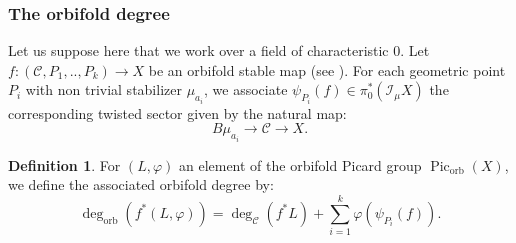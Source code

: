 \documentclass{proc-l}
\DeclareMathOperator{\Pic}{Pic}
\DeclareMathOperator{\stack}{stack}
\DeclareMathOperator{\orb}{orb}
\newcommand{\sheafE}{\mathcal{E}}
\newcommand{\sheafI}{\mathcal{I}}
\newcommand{\sheafO}{\mathcal{O}}
\newcommand{\twistsector}{\pi_0^*(\sheafI_{\mu} X)}
\newtheorem{theorem}{Theorem}[section]
\theoremstyle{definition}
\newtheorem{definition}[theorem]{Definition}
\theoremstyle{remark}
\newtheorem{remark}[theorem]{Remark}
\numberwithin{equation}{section}
\begin{document}
\subsubsection{The orbifold degree}\label{paragraph_orbifold_degree}

Let us suppose here that we work over a field of characteristic 0. Let $f : \left(\mathcal{C},P_1,..,P_k\right) \rightarrow X$ be an orbifold stable map (see \cite[section 4.3]{abramovich2008gromovwittentheorydelignemumfordstacks}). For each geometric point $P_i$ with non trivial stabilizer $\mu_{a_i}$, we associate $\psi_{P_i}(f) \in \twistsector$ the corresponding twisted sector given by the natural map:
$$ B \mu_{a_i} \rightarrow \mathcal{C} \rightarrow X .$$

\begin{definition}\label{definition_degree_stacky_curve}
    For $(L,\varphi)$ an element of the orbifold Picard group $\Pic_{\orb}(X)$, we define the associated orbifold degree by:
$$ \deg_{\orb}\left(f^*(L,\varphi)\right) = \deg_{\mathcal{C}}(f^* L) + \sum\limits_{i = 1}^k \varphi(\psi_{P_i}(f)) .$$
\end{definition}



%
%
%
\end{document}
